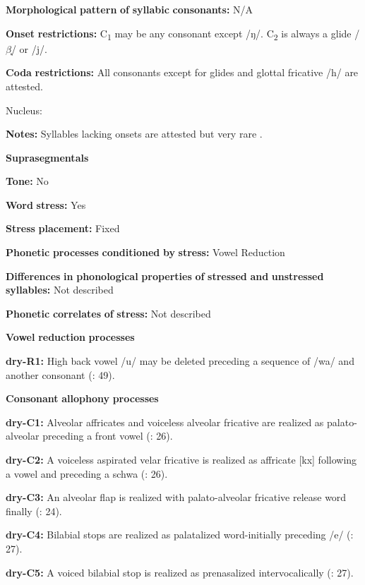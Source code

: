 \begin{styleBody}
\textbf{Morphological} \textbf{pattern} \textbf{of} \textbf{syllabic} \textbf{consonants:} N/A

\textbf{Onset} \textbf{restrictions:} C\textsubscript{1} may be any consonant except /ŋ/. C\textsubscript{2} is always a glide /$\beta ̞$/ or /j/.

\textbf{Coda} \textbf{restrictions:} All consonants except for glides and glottal fricative /h/ are attested.

Nucleus:

\textbf{Notes:} Syllables lacking onsets are attested but very rare \citep[19]{Dhakal2012}.

\textbf{Suprasegmentals}

\textbf{Tone:} No

\textbf{Word} \textbf{stress:} Yes

\textbf{Stress} \textbf{placement:} Fixed

\textbf{Phonetic} \textbf{processes} \textbf{conditioned} \textbf{by} \textbf{stress:} Vowel Reduction

\textbf{Differences} \textbf{in} \textbf{phonological} \textbf{properties} \textbf{of} \textbf{stressed} \textbf{and} \textbf{unstressed} \textbf{syllables:} Not described

\textbf{Phonetic} \textbf{correlates} \textbf{of} \textbf{stress:} Not described

\textbf{Vowel} \textbf{reduction} \textbf{processes}

\textbf{dry-R1:} High back vowel /u/ may be deleted preceding a sequence of /wa/ and another consonant (\citealt{KotapishKotapish1973}: 49).

\textbf{Consonant} \textbf{allophony} \textbf{processes}

\textbf{dry-C1:} Alveolar affricates and voiceless alveolar fricative are realized as palato-alveolar preceding a front vowel (\citealt{KotapishKotapish1973}: 26).

\textbf{dry-C2:} A voiceless aspirated velar fricative is realized as affricate [kx] following a vowel and preceding a schwa (\citealt{KotapishKotapish1973}: 26).

\textbf{dry-C3:} An alveolar flap is realized with palato-alveolar fricative release word finally (\citealt{KotapishKotapish1973}: 24).

\textbf{dry-C4:} Bilabial stops are realized as palatalized word-initially preceding /e/ (\citealt{KotapishKotapish1973}: 27).

\textbf{dry-C5:} A voiced bilabial stop is realized as prenasalized intervocalically (\citealt{KotapishKotapish1973}: 27).


\end{styleBody}
